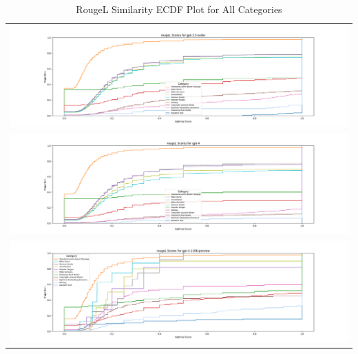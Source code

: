 \documentclass{article}
\begin{document}
\begin{table}[ht] 
\centering 
\begin{tabular}{c} 
\includegraphics[width=1.0\textwidth]{plots/rougeL-ecdf-plot-gpt-3.5-turbo.png}  \\  
\includegraphics[width=1.0\textwidth]{plots/rougeL-ecdf-plot-gpt-4.png}  \\ 
\includegraphics[width=1.0\textwidth]{plots/rougeL-ecdf-plot-gpt-4-1106-preview.png}  \\ 
\end{tabular} 
\caption{RougeL Similarity ECDF Plot for All Categories} 
\label{tab:images} 
\end{table}
\end{document}
